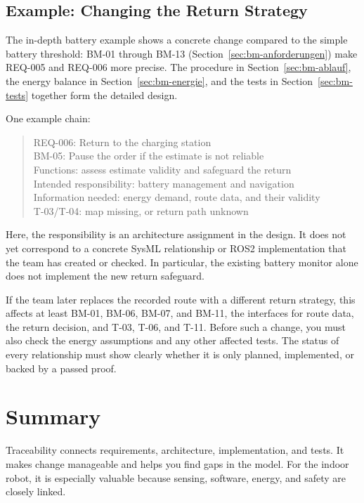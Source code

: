 \subsection{Example: Changing the Return Strategy}
The in-depth battery example shows a concrete change compared to the simple battery threshold: BM-01 through BM-13 (Section~\ref{sec:bm-anforderungen}) make REQ-005 and REQ-006 more precise. The procedure in Section~\ref{sec:bm-ablauf}, the energy balance in Section~\ref{sec:bm-energie}, and the tests in Section~\ref{sec:bm-tests} together form the detailed design.

One example chain:
\begin{quote}
REQ-006: Return to the charging station\\
BM-05: Pause the order if the estimate is not reliable\\
Functions: assess estimate validity and safeguard the return\\
Intended responsibility: battery management and navigation\\
Information needed: energy demand, route data, and their validity\\
T-03/T-04: map missing, or return path unknown
\end{quote}

Here, the responsibility is an architecture assignment in the design. It does not yet correspond to a concrete SysML relationship or ROS2 implementation that the team has created or checked. In particular, the existing battery monitor alone does not implement the new return safeguard.

If the team later replaces the recorded route with a different return strategy, this affects at least BM-01, BM-06, BM-07, and BM-11, the interfaces for route data, the return decision, and T-03, T-06, and T-11. Before such a change, you must also check the energy assumptions and any other affected tests. The status of every relationship must show clearly whether it is only planned, implemented, or backed by a passed proof.

\section{Summary}
Traceability connects requirements, architecture, implementation, and tests. It makes change manageable and helps you find gaps in the model. For the indoor robot, it is especially valuable because sensing, software, energy, and safety are closely linked.

